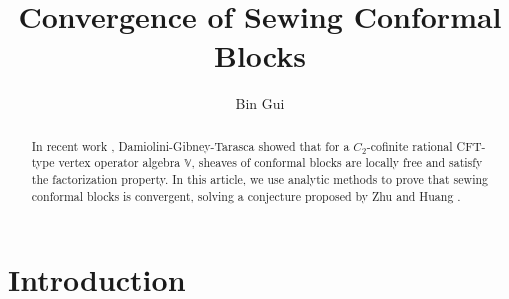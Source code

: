 \documentclass[12pt,a4paper,notitlepage]{article}
\title{Convergence of Sewing Conformal Blocks}
\author{{\sc Bin Gui}
}
\date{}
\theoremstyle{definition}
\theoremstyle{plain}
\newcommand{\Vbb}{\mathbb V}
\numberwithin{equation}{section}
\begin{document}
\sloppy %



	\maketitle









\tableofcontents


	











\newpage


\begin{abstract}
In recent work \cite{DGT19b}, Damiolini-Gibney-Tarasca showed that for a $C_2$-cofinite rational CFT-type vertex operator algebra $\Vbb$, sheaves of conformal blocks are locally free and satisfy the factorization property. In this article, we use analytic methods to  prove that sewing conformal blocks is convergent, solving a conjecture proposed by Zhu \cite{Zhu94} and Huang \cite{Hua16}.
\end{abstract}


\section*{Introduction}
\end{document}
